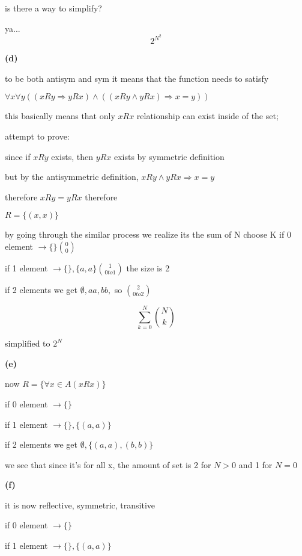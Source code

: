 \documentclass[12pts,A4]{article}
\begin{document}
\begin{flushleft}
    is there a way to simplify?

    ya... $$ 2^{N^2} $$



    \textbf{(d)}
    
    to be both antisym and sym it means that the function needs to satisfy

    $ \forall x \forall y ((xRy \Rightarrow yRx) \wedge ((xRy \wedge yRx) \Rightarrow x = y ))$ 

    this basically means that only $xRx$ relationship can exist inside of the set;
    
    attempt to prove:

    since if $xRy$ exists, then $yRx$ exists by symmetric definition
    
    but by the antisymmetric definition, $xRy \wedge yRx \Rightarrow  x = y$

    therefore $xRy = yRx$ therefore

    $ R = \{(x,x)\} $

    \bigskip

    by going through the similar process we realize its the sum of N choose K
    if 0 element $\rightarrow \{\} \binom{0}{0}$

    if 1 element $\rightarrow \{\} , \{a,a\} \binom{1} {0 to 1} $ the size is 2

    if 2 elements we get $ \emptyset , aa ,  bb, $ so $ \binom{2} {0 to 2} $ 

    $$\sum_{k=0}^{N} \binom{N} {k} $$ 
   
    simplified to $ 2 ^{N}$
    
    \bigskip

    \textbf{(e)}
    
    now $ R = \{  \forall x \in A ( xRx ) \} $ 

    if 0 element $\rightarrow \{\}$ 

    if 1 element $\rightarrow \{\} , \{(a,a)\}$ 

    if 2 elements we get $ \emptyset , \{ (a,a),(b,b) \}$

    we see that since it's for all x, the amount of set is 2 for $N > 0$ and 1 for $N = 0$

   \bigskip

    \textbf{(f)}
    

    it is now reflective, symmetric, transitive

    if 0 element $\rightarrow \{\}$ 

    if 1 element $\rightarrow \{\} , \{(a,a)\}$ 


\end{flushleft}
\end{document}
